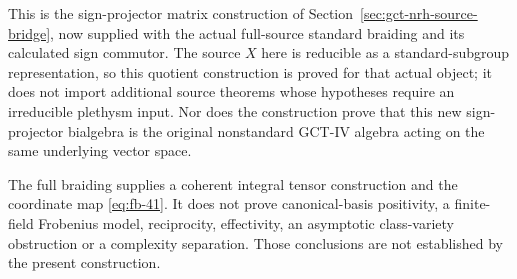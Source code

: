 This is the sign-projector matrix construction of
Section~\ref{sec:gct-nrh-source-bridge}, now supplied with the actual
full-source standard braiding and its calculated sign commutor. The source \(X\) here is
reducible as a standard-subgroup representation, so this quotient
construction is proved for that actual object; it does not import
additional source theorems whose hypotheses require an irreducible
plethysm input. Nor does the construction prove that this new
sign-projector bialgebra is the original nonstandard GCT-IV algebra
acting on the same underlying vector space.

The full braiding supplies a coherent integral tensor construction
and the coordinate map \eqref{eq:fb-41}. It does not prove canonical-basis
positivity, a finite-field Frobenius model, reciprocity, effectivity,
an asymptotic class-variety obstruction or a complexity separation.
Those conclusions are not established by the present construction.

